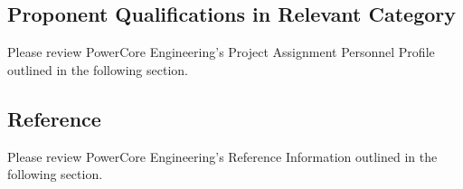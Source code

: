 \pagebreak
\subsection{Proponent Qualifications in Relevant Category}
\label{Sub:Qual}

Please review PowerCore Engineering's Project Assignment Personnel Profile outlined in the following section.



\subsection{Reference}
\label{Sub:Ref}

Please review PowerCore Engineering's Reference Information outlined in the following section. 





